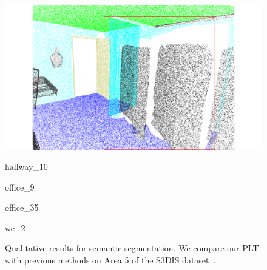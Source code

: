 \begin{figure}[htbp]
\begin{minipage}{0.22\textwidth}
    \end{minipage}
    \hfill
    \begin{minipage}{0.22\textwidth}
        \centering
        \includegraphics[width=\textwidth]{fig/supplement/semantic_segmentation/wc_2/GT_wc_2.pdf}
    \end{minipage}
    \hfill
    
    \vspace{0.5em}
    \begin{minipage}{0.1\textwidth} %
        \color{white}{12}
    \end{minipage}
    \hfill
    \begin{minipage}{0.22\textwidth} %
        \centering
        hallway\_10
    \end{minipage}
    \hfill
    \begin{minipage}{0.22\textwidth} %
        \centering
        office\_9
    \end{minipage}
    \hfill
    \begin{minipage}{0.22\textwidth} %
        \centering
        office\_35
    \end{minipage}
    \hfill
    \begin{minipage}{0.22\textwidth} %
        \centering
        wc\_2
    \end{minipage}
    \hfill
    \caption{Qualitative results for semantic segmentation. We compare our PLT with previous methods on Area 5 of the S3DIS dataset~\cite{armeni20163d}.}
    \label{fig:semantic}

\end{figure}
